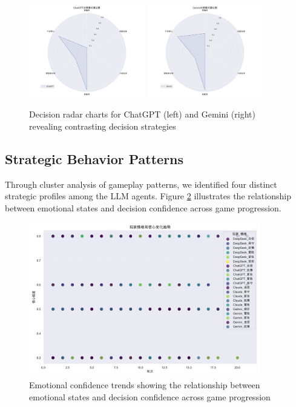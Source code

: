 \documentclass{article}
\begin{document}
\begin{figure}[H]
    \centering
    \includegraphics[width=0.45\textwidth]{figures/ChatGPT_decision_radar.png}
    \includegraphics[width=0.45\textwidth]{figures/Gemini_decision_radar.png}
    \caption{Decision radar charts for ChatGPT (left) and Gemini (right) revealing contrasting decision strategies}
    \label{fig:other_models_decision_radar}
\end{figure}

\subsection{Strategic Behavior Patterns}
Through cluster analysis of gameplay patterns, we identified four distinct strategic profiles among the LLM agents. Figure \ref{fig:emotion_confidence} illustrates the relationship between emotional states and decision confidence across game progression.

\begin{figure}[H]
    \centering
    \includegraphics[width=0.9\textwidth]{figures/emotion_confidence_trend.png}
    \caption{Emotional confidence trends showing the relationship between emotional states and decision confidence across game progression}
    \label{fig:emotion_confidence}
\end{figure}
\end{document}

